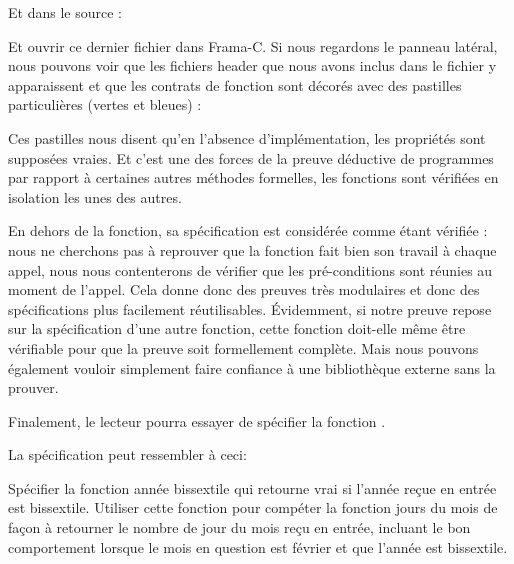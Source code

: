 


Et dans le source :






Et ouvrir ce dernier fichier dans Frama-C. Si nous regardons le panneau latéral, 
nous pouvons voir que les fichiers header que nous avons inclus dans le fichier 
 y apparaissent et que les contrats de fonction sont décorés avec des 
pastilles particulières (vertes et bleues) :





Ces pastilles nous disent qu'en l'absence d'implémentation, les propriétés sont
supposées vraies. Et c'est une des forces de la preuve déductive de programmes 
par rapport à certaines autres méthodes formelles, les fonctions sont vérifiées
en isolation les unes des autres.



En dehors de la fonction, sa spécification est considérée comme étant 
vérifiée : nous ne cherchons pas à reprouver que la fonction fait bien son travail
à chaque appel, nous nous contenterons de vérifier que les pré-conditions sont 
réunies au moment de l'appel. Cela donne donc des preuves très modulaires et donc 
des spécifications plus facilement réutilisables. Évidemment, si notre preuve 
repose sur la spécification d'une autre fonction, cette fonction doit-elle même 
être vérifiable pour que la preuve soit formellement complète. Mais nous pouvons
également vouloir simplement faire confiance à une bibliothèque externe sans la
prouver.



Finalement, le lecteur pourra essayer de spécifier la fonction .



La spécification peut ressembler à ceci:









\label{l4:contract-modularity-ex-days-of-month}


Spécifier la fonction année bissextile qui retourne vrai si l'année reçue
en entrée est bissextile. Utiliser cette fonction pour compéter la fonction
jours du mois de façon à retourner le nombre de jour du mois reçu en entrée,
incluant le bon comportement lorsque le mois en question est février et que
l'année est bissextile.


